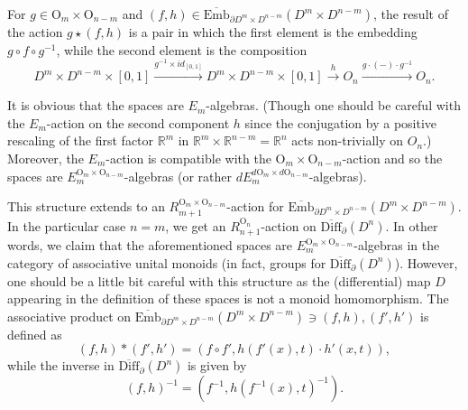 \documentclass[11pt]{amsart}
\theoremstyle{definition}
\newcommand{\R}{{\mathbb R}}
\newcommand{\Ebar}{\overline{\mathrm{Emb}}}
\newcommand{\Dbarn}{\overline{\mathrm{Diff}}_\partial(D^n)}
\newcommand{\OO}{\mathrm{O}}
\numberwithin{equation}{section}
\begin{document}
 For $g\in\OO_m\times\OO_{n-m}$ and $(f,h)\in \Ebar_{\partial D^m\times D^{n-m}}(D^m\times D^{n-m})$, the result of the action 
 $g\star (f,h)$ is a pair in which the first element is the embedding $g\circ f\circ g^{-1}$, while the second element is the composition
 \[
 D^m\times D^{n-m}\times[0,1]\xrightarrow{g^{-1}\times id_{[0,1]}}D^m\times D^{n-m}\times[0,1]\xrightarrow{h}O_n\xrightarrow{g\cdot(-)\cdot g^{-1}} O_n.
 \]
 
 It is obvious that the spaces are $E_m$-algebras. (Though one should be careful with the $E_m$-action on the second component $h$ since the conjugation by a positive rescaling of the first
  factor $\R^m$ in $\R^m\times\R^{n-m}=\R^{n}$ acts non-trivially on $O_n$.) Moreover, the $E_m$-action is compatible with the  $\OO_m\times\OO_{n-m}$-action
 and so the spaces are $E_m^{\OO_m\times\OO_{n-m}}$-algebras (or rather $dE_m^{d\OO_m\times d\OO_{n-m}}$-algebras). 
 
 This structure extends to an $R_{m+1}^{\OO_m\times\OO_{n-m}}$-action for $\Ebar_{\partial D^m\times D^{n-m}}(D^m\times D^{n-m})$.
 In the particular case $n=m$, we get an $R_{n+1}^{\OO_n}$-action on $\Dbarn$. In other words, we claim that the aforementioned spaces are
 $E_m^{\OO_m\times\OO_{n-m}}$-algebras in the category of associative unital monoids (in fact, groups for $\Dbarn$).  However, one should be a little bit careful
 with this structure as the (differential) map $D$ appearing in the definition of these spaces is not a monoid homomorphism. 
 The associative product on $\Ebar_{\partial D^m\times D^{n-m}}(D^m\times D^{n-m})\ni (f,h),(f',h')$ is defined as
 \[
 (f,h)*(f',h')=(f\circ f',h(f'(x),t)\cdot h'(x,t)),
 \]
 while the inverse in $\Dbarn$ is given by
 \[
(f,h)^{-1}=(f^{-1},h(f^{-1}(x),t)^{-1}).
 \]
\end{document}
